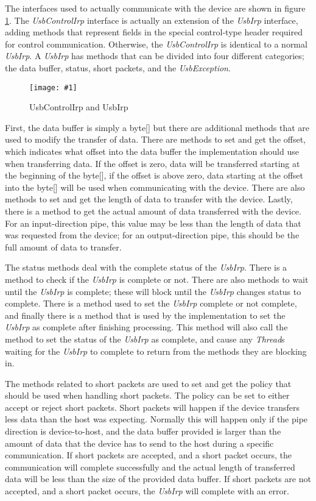 \documentclass{article}
\newcommand{\myclass}[1]{\emph{#1}}
\newcommand{\myinterface}[1]{\emph{#1}}
\newcommand{\myfigure}[3]{\begin{figure}[htbp]\centering\texttt{[image: \#1]}\caption{#2}\label{#3}\end{figure}}
\begin{document}
The interfaces used to actually communicate with the device are shown in
figure \ref{UsbIrps}.  The \myinterface{UsbControlIrp} interface is actually an extension
of the \myinterface{UsbIrp} interface, adding methods that represent fields in the special
control-type header required for control communication.  Otherwise, the
\myinterface{UsbControlIrp} is identical to a normal \myinterface{UsbIrp}.  A \myinterface{UsbIrp} has methods that
can be divided into four different categories; the data buffer, status,
short packets, and the \myclass{UsbException}.

\myfigure{figs/UsbIrps}{UsbControlIrp and UsbIrp}{UsbIrps}

First, the data buffer is simply a byte[] but there are additional methods that
are used to modify the transfer of data.  There are methods to set and get the
offset, which indicates what offset into the data buffer the implementation
should use when transferring data.  If the offset is zero, data will be transferred
starting at the beginning of the byte[], if the offset is above zero, data starting
at the offset into the byte[] will be used when communicating with the device.
There are also methods to set and get the length of data to transfer with the device.
Lastly, there is a method to get the actual amount of data transferred with the device.
For an input-direction pipe, this value may be less than the length of data that was
requested from the device; for an output-direction pipe, this should be the full
amount of data to transfer.

The status methods deal with the complete status of the \myinterface{UsbIrp}.  There is a method to
check if the \myinterface{UsbIrp} is complete or not.  There are also methods to wait until the \myinterface{UsbIrp}
is complete; these will block until the \myinterface{UsbIrp} changes status to complete.  There
is a method used to set the \myinterface{UsbIrp} complete or not complete, and finally there is a
method that is used by the implementation to set the \myinterface{UsbIrp} as complete after finishing
processing.  This method will also call the method to set the status of the \myinterface{UsbIrp} as
complete, and cause any \myclass{Thread}s waiting for the \myinterface{UsbIrp} to complete to return from
the methods they are blocking in.

The methods related to short packets are used to set and get the policy that should be
used when handling short packets.  The policy can be set to either accept or reject
short packets.  Short packets will happen if the device transfers less data than the
host was expecting.  Normally this will happen only if the pipe direction is
device-to-host, and the data buffer provided is larger than the amount of data that
the device has to send to the host during a specific communication.  If short packets
are accepted, and a short packet occurs, the communication will complete successfully
and the actual length of transferred data will be less than the size of the provided
data buffer.  If short packets are not accepted, and a short packet occurs, the
\myinterface{UsbIrp} will complete with an error.
\end{document}
